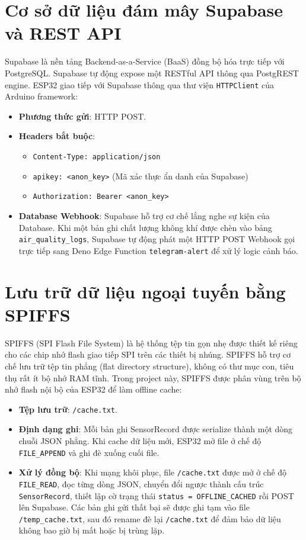 \section{Cơ sở dữ liệu đám mây Supabase và REST API}
Supabase là nền tảng Backend-as-a-Service (BaaS) đồng bộ hóa trực tiếp với PostgreSQL. Supabase tự động expose một RESTful API thông qua PostgREST engine.
ESP32 giao tiếp với Supabase thông qua thư viện \texttt{HTTPClient} của Arduino framework:
\begin{itemize}
    \item \textbf{Phương thức gửi}: HTTP POST.
    \item \textbf{Headers bắt buộc}:
  \begin{itemize}
      \item \texttt{Content-Type: application/json}
      \item \texttt{apikey: <anon\_key>} (Mã xác thực ẩn danh của Supabase)
      \item \texttt{Authorization: Bearer <anon\_key>}
    \end{itemize}
    \item \textbf{Database Webhook}: Supabase hỗ trợ cơ chế lắng nghe sự kiện của Database. Khi một bản ghi chất lượng không khí được chèn vào bảng \texttt{air\_quality\_logs}, Supabase tự động phát một HTTP POST Webhook gọi trực tiếp sang Deno Edge Function \texttt{telegram-alert} để xử lý logic cảnh báo.
\end{itemize}

\section{Lưu trữ dữ liệu ngoại tuyến bằng SPIFFS}
SPIFFS (SPI Flash File System) là hệ thống tệp tin gọn nhẹ được thiết kế riêng cho các chip nhớ flash giao tiếp SPI trên các thiết bị nhúng. SPIFFS hỗ trợ cơ chế lưu trữ tệp tin phẳng (flat directory structure), không có thư mục con, tiêu thụ rất ít bộ nhớ RAM tĩnh.
Trong project này, SPIFFS được phân vùng trên bộ nhớ flash nội bộ của ESP32 để làm offline cache:
\begin{itemize}
    \item \textbf{Tệp lưu trữ}: \texttt{/cache.txt}.
    \item \textbf{Định dạng ghi}: Mỗi bản ghi SensorRecord được serialize thành một dòng chuỗi JSON phẳng. Khi cache dữ liệu mới, ESP32 mở file ở chế độ \texttt{FILE\_APPEND} và ghi đè xuống cuối file.
    \item \textbf{Xử lý đồng bộ}: Khi mạng khôi phục, file \texttt{/cache.txt} được mở ở chế độ \texttt{FILE\_READ}, đọc từng dòng JSON, chuyển đổi ngược thành cấu trúc \texttt{SensorRecord}, thiết lập cờ trạng thái \texttt{status = OFFLINE\_CACHED} rồi POST lên Supabase. Các bản ghi gửi thất bại sẽ được ghi tạm vào file \texttt{/temp\_cache.txt}, sau đó rename đè lại \texttt{/cache.txt} để đảm bảo dữ liệu không bao giờ bị mất hoặc bị trùng lặp.
\end{itemize}
